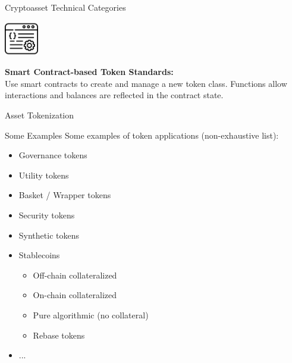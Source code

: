 \documentclass[handout]{beamer}
\begin{document}
\begin{frame}{Cryptoasset Technical Categories}
		\pause
		\vspace{2 em}
		\begin{minipage}{0.2\textwidth}
			\begin{center}
				\includegraphics[height=4em]{../assets/images/CA}
			\end{center}
		\end{minipage}
		\begin{minipage}{0.75\textwidth}
			\textbf{Smart Contract-based Token Standards:} \\
			Use smart contracts to create and manage a new token class. Functions allow interactions and balances are reflected in the contract state.
		\end{minipage}

\end{frame}

\begin{frame}{Asset Tokenization}
	\begin{figure} [h]
 		\center
			
 	\end{figure}
\end{frame}

\begin{frame}{Some Examples}
Some examples of token applications (non-exhaustive list):
	\begin{itemize}
		\item<2-> Governance tokens
		\item<3-> Utility tokens
		\item<4-> Basket / Wrapper tokens
		\item<5-> Security tokens
		\item<6-> Synthetic tokens
		\item<7-> Stablecoins
		\begin{itemize}
			\item<8-> Off-chain collateralized
			\item<9-> On-chain collateralized
			\item<10-> Pure algorithmic (no collateral)
			\item<11-> Rebase tokens
		\end{itemize}
		\item<12-> ...
 	\end{itemize}
 	
\end{frame}
\end{document}
